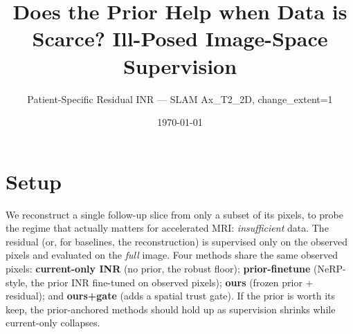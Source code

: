 \documentclass[11pt]{article}
\title{Does the Prior Help when Data is Scarce? Ill-Posed Image-Space Supervision}
\author{Patient-Specific Residual INR --- SLAM Ax\_T2\_2D, change\_extent=1}
\date{\today}
\begin{document}
\maketitle
\section*{Setup}
We reconstruct a single follow-up slice from only a subset of its pixels, to probe the regime that actually matters for accelerated MRI: \emph{insufficient} data. The residual (or, for baselines, the reconstruction) is supervised only on the observed pixels and evaluated on the \emph{full} image. Four methods share the same observed pixels: \textbf{current-only INR} (no prior, the robust floor); \textbf{prior-finetune} (NeRP-style, the prior INR fine-tuned on observed pixels); \textbf{ours} (frozen prior + residual); and \textbf{ours+gate} (adds a spatial trust gate). If the prior is worth its keep, the prior-anchored methods should hold up as supervision shrinks while current-only collapses.
\end{document}
